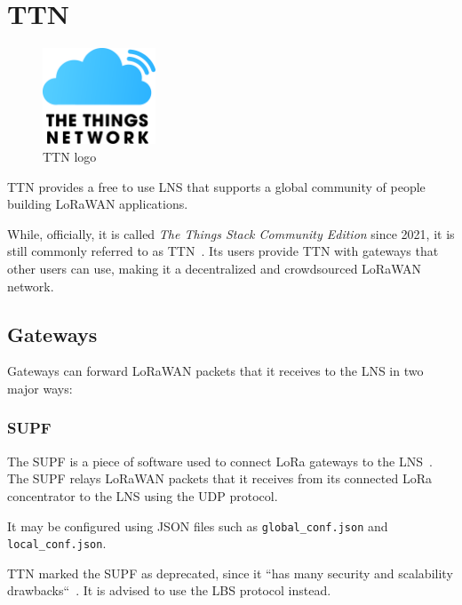 \section{\acf{TTN}}

\begin{figure}[h]
    \centering
    \includegraphics[width=0.3\textwidth]{pictures/logos/TTN-logo.eps}
    \caption{\acf{TTN} logo~\protect\cite{the_things_industries_bv_quick_nodate}}
\end{figure}

\ac{TTN} provides a free to use \ac{LNS} that supports a global community of people building \ac{LoRaWAN} applications.

While, officially, it is called \emph{The Things Stack Community Edition} since 2021, it is still commonly referred to as \acf{TTN}~\cite{the_things_industries_bv_what_2022}.
Its users provide \ac{TTN} with gateways that other users can use, making it a decentralized and crowdsourced \ac{LoRaWAN} network.

\subsection{Gateways}

Gateways can forward \ac{LoRaWAN} packets that it receives to the \ac{LNS} in two major ways:

\subsubsection{\acf{SUPF}}

The \acl{SUPF} is a piece of software used to connect \ac{LoRa} gateways to the \ac{LNS}~\cite{the_things_industries_bv_semtech_2022}.
The \ac{SUPF} relays \ac{LoRaWAN} packets that it receives from its connected \ac{LoRa} concentrator to the \ac{LNS} using the \ac{UDP} protocol.

It may be configured using JSON files such as \lstinline{global_conf.json} and \lstinline{local_conf.json}.

\ac{TTN} marked the \acl{SUPF} as deprecated, since it ``has many security and scalability drawbacks``~\cite{the_things_industries_bv_semtech_2022}.
It is advised to use the \acl{LBS} protocol instead.

